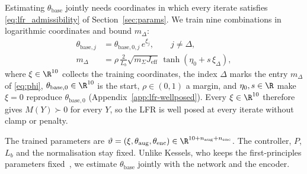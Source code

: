 Estimating $\theta_{\mathrm{base}}$ jointly needs coordinates in which every
iterate satisfies \eqref{eq:lfr_admissibility} of Section~\ref{sec:params}.
We train nine combinations in logarithmic coordinates and bound $m_\Delta$:
\begin{equation}
\begin{aligned}
 \theta_{\mathrm{base},j}&=\theta_{\mathrm{base},0,j}\,e^{\xi_j},
 \qquad j\neq\Delta,\\
 m_\Delta&=\rho\,\frac{2}{L_b}\sqrt{m_\Sigma J_{\mathrm{eff}}}\,
 \tanh(\eta_0+s\,\xi_\Delta),
\end{aligned}
\label{eq:mdelta_map}
\end{equation}
where $\xi\in\R^{10}$ collects the training coordinates, the index $\Delta$
marks the entry $m_\Delta$ of \eqref{eq:phi}, $\theta_{\mathrm{base},0}\in\R^{10}$
is the start, $\rho\in(0,1)$ a margin, and $\eta_0,s\in\R$ make $\xi=0$
reproduce $\theta_{\mathrm{base},0}$ (Appendix~\ref{app:lfr-wellposed}).
Every $\xi\in\R^{10}$ therefore gives $M(Y)\succ0$ for every $Y$, so the LFR is
well posed at every iterate without clamp or penalty.

The trained parameters are $\vartheta=(\xi,\theta_{\mathrm{aug}},
\theta_{\mathrm{enc}})\in\R^{10+n_{\mathrm{aug}}+n_{\mathrm{enc}}}$.
The controller, $P$, $L_b$ and the normalisation stay fixed.
Unlike Kessels, who keeps the first-principles parameters
fixed~\cite[Eq.~(5.12)]{kessels2025ai}, we estimate $\theta_{\mathrm{base}}$
jointly with the network and the encoder.

